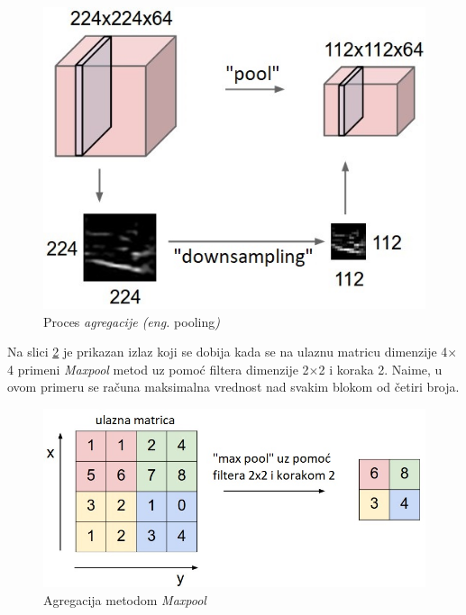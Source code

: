 \documentclass[a4paper]{article}
\begin{document}
\begin{figure}[h!]
\begin{center}
\includegraphics[scale=0.4]{pool.jpeg}
\end{center}
\caption{Proces \textit{agregacije (eng.} pooling\textit{)}}
\label{fig:pool}
\end{figure}

Na slici \ref{fig:maxpool} je prikazan izlaz koji se dobija kada se na ulaznu matricu dimenzije 4$\times$4 primeni \textit{Maxpool} metod uz pomoć filtera dimenzije 2$\times$2 i koraka 2. Naime, u ovom primeru se računa maksimalna vrednost nad svakim blokom od četiri broja.
 
\begin{figure}[h!]
\begin{center}
\includegraphics[scale=0.4]{maxpool.jpeg}
\end{center}
\caption{Agregacija metodom \textit{Maxpool}}
\label{fig:maxpool}
\end{figure}
\end{document}
